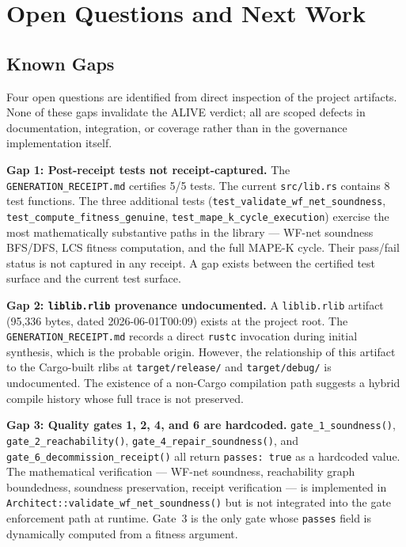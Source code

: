 
\section{Open Questions and Next Work}
\label{sec:blue-river-dam-questions}

\subsection{Known Gaps}
\label{sec:blue-river-dam-questions-gaps}

Four open questions are identified from direct inspection of the project
artifacts. None of these gaps invalidate the ALIVE verdict; all are scoped
defects in documentation, integration, or coverage rather than in the
governance implementation itself.

\textbf{Gap 1: Post-receipt tests not receipt-captured.}
The \texttt{GENERATION\_RECEIPT.md} certifies 5/5 tests. The current
\texttt{src/lib.rs} contains 8 test functions. The three additional tests
(\texttt{test\_validate\_wf\_net\_soundness}, \texttt{test\_compute\_fitness\_genuine},
\texttt{test\_mape\_k\_cycle\_execution}) exercise the most mathematically
substantive paths in the library --- WF-net soundness BFS/DFS, LCS fitness
computation, and the full MAPE-K cycle. Their pass/fail status is not captured
in any receipt. A gap exists between the certified test surface and the current
test surface.

\textbf{Gap 2: \texttt{liblib.rlib} provenance undocumented.}
A \texttt{liblib.rlib} artifact (95{,}336 bytes, dated 2026-06-01T00:09) exists
at the project root. The \texttt{GENERATION\_RECEIPT.md} records a direct
\texttt{rustc} invocation during initial synthesis, which is the probable
origin. However, the relationship of this artifact to the Cargo-built rlibs at
\texttt{target/release/} and \texttt{target/debug/} is undocumented. The
existence of a non-Cargo compilation path suggests a hybrid compile history
whose full trace is not preserved.

\textbf{Gap 3: Quality gates 1, 2, 4, and 6 are hardcoded.}
\texttt{gate\_1\_soundness()}, \texttt{gate\_2\_reachability()},
\texttt{gate\_4\_repair\_soundness()}, and \texttt{gate\_6\_decommission\_receipt()}
all return \texttt{passes: true} as a hardcoded value. The mathematical
verification --- WF-net soundness, reachability graph boundedness, soundness
preservation, receipt verification --- is implemented in
\texttt{Architect::validate\_wf\_net\_soundness()} but is not integrated into
the gate enforcement path at runtime. Gate~3 is the only gate whose
\texttt{passes} field is dynamically computed from a fitness argument.

